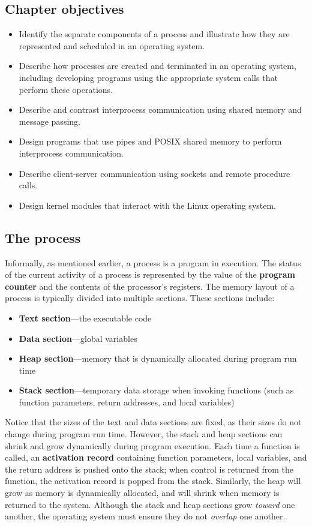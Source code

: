 \subsection*{Chapter objectives}
\begin{itemize}
    \item Identify the separate components of a process and illustrate how they are represented and scheduled in an operating system.
    \item Describe how processes are created and terminated in an operating system, including developing programs using the appropriate system calls that perform these operations.
    \item Describe and contrast interprocess communication using shared memory and message passing.
    \item Design programs that use pipes and POSIX shared memory to perform interprocess communication.
    \item Describe client-server communication using sockets and remote procedure calls.
    \item Design kernel modules that interact with the Linux operating system.
\end{itemize}

\subsection*{The process}\label{sec:3.1:the_process}
Informally, as mentioned earlier, a process is a program in execution. The status of the current activity of a process is represented by the value of the \textbf{program counter} and the contents of the processor's registers. The memory layout of a process is typically divided into multiple sections. These sections include:
\begin{itemize}
    \item \textbf{Text section}---the executable code
    \item \textbf{Data section}---global variables
    \item \textbf{Heap section}---memory that is dynamically allocated during program run time
    \item \textbf{Stack section}---temporary data storage when invoking functions (such as function parameters, return addresses, and local variables)
\end{itemize}
Notice that the sizes of the text and data sections are fixed, as their sizes do not change during program run time. However, the stack and heap sections can shrink and grow dynamically during program execution. Each time a function is called, an \textbf{activation record} containing function parameters, local variables, and the return address is pushed onto the stack; when control is returned from the function, the activation record is popped from the stack. Similarly, the heap will grow as memory is dynamically allocated, and will shrink when memory is returned to the system. Although the stack and heap sections grow \textit{toward} one another, the operating system must ensure they do not \textit{overlap} one another.

